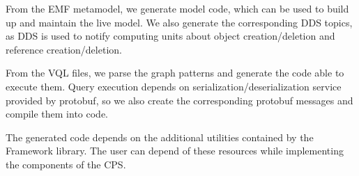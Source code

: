 From the EMF metamodel, we generate model code, which can be used to build up and maintain the live model. 
We also generate the corresponding DDS topics, as DDS is used to notify computing units about object creation/deletion and reference creation/deletion.

From the VQL files, we parse the graph patterns and generate the code able to execute them.
Query execution depends on serialization/deserialization service provided by protobuf, so we also create the corresponding protobuf messages and compile them into \cpp{} code.

The generated code depends on the additional utilities contained by the Framework library. The user can depend of these resources while implementing the components of the CPS.


